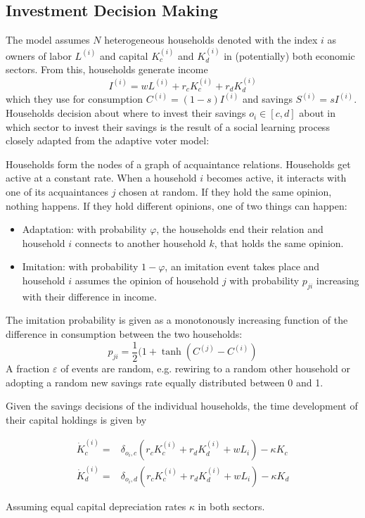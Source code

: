 \subsection{Investment Decision Making}

The model assumes $N$ heterogeneous households denoted with the index $i$ as owners of labor $L^{(i)}$ and capital $K_c^{(i)}$ and $K_d^{(i)}$ in (potentially) both economic sectors.
From this, households generate income
\begin{equation}
	I^{(i)} = w L^{(i)} + r_c K_c^{(i)} + r_d K_d^{(i)}
	\label{household_income}
\end{equation}
which they use for consumption $C^{(i)} = (1-s) I^{(i)}$ and savings $S^{(i)} = s I^{(i)}$. Households decision about where to invest their savings $o_i \in [c,d]$ about in which sector to invest their savings is the result of a social learning process closely adapted from the adaptive voter model:

Households form the nodes of a graph of acquaintance relations. Households get active at a constant rate. When a household $i$ becomes active, it interacts with one of its acquaintances $j$ chosen at random. If they hold the same opinion, nothing happens. If they hold different opinions, one of two things can happen:
\begin{itemize}
	\item Adaptation: with probability $\varphi$, the households end their relation and household $i$ connects to another household $k$, that holds the same opinion. 
	\item Imitation: with probability $1-\varphi$, an imitation event takes place and household $i$ assumes the opinion of household $j$ with probability $p_{ji}$ increasing with their difference in income.
\end{itemize}
The imitation probability is given as a monotonously increasing function of the difference in consumption between the two households:
\begin{equation}
	p_{ji} = \frac{1}{2}(1 + \tanh \left( C^{(j)} - C^{(i)}  \right)
	\label{imitation_probability}
\end{equation}
A fraction $\varepsilon$ of events are random, e.g. rewiring to a random other household or adopting a random new savings rate equally distributed between 0 and 1.

Given the savings decisions of the individual households, the time development of their capital holdings is given by

\begin{align}
	\dot{K}_c^{(i)} =& \delta_{o_i, c} \left( r_c K_c^{(i)} + r_d K_d^{(i)} + w L_i \right) - \kappa K_c \\
	\dot{K}_d^{(i)} =& \delta_{o_i, d} \left( r_c K_c^{(i)} + r_d K_d^{(i)} + w L_i \right) - \kappa K_d 
\end{align}

Assuming equal capital depreciation rates $\kappa$ in both sectors.
